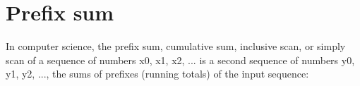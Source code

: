 \section{Prefix sum}
\label{sect:appendix:prefix_sum}
In computer science, the prefix sum, cumulative sum, inclusive scan, or simply scan of a sequence of numbers x0, x1, x2, ... is a second sequence of numbers y0, y1, y2, ..., the sums of prefixes (running totals) of the input sequence: